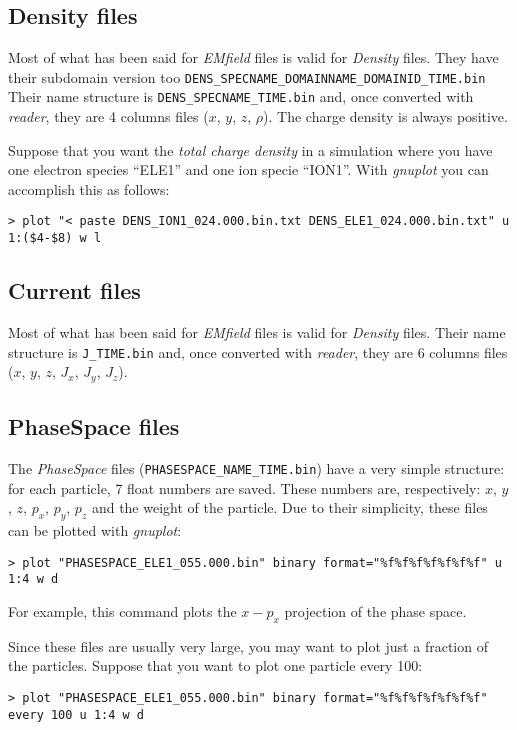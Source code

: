 \documentclass[11pt,a4paper]{report}
\begin{document}
\subsection{Density files}
Most of what has been said for \emph{EMfield} files is valid for \emph{Density} files. They have their subdomain version too \verb+DENS_SPECNAME_DOMAINNAME_DOMAINID_TIME.bin+ Their name structure is \verb+DENS_SPECNAME_TIME.bin+ and, once converted with \emph{reader}, they are 4 columns files ($x$, $y$, $z$, $\rho$). The charge density is always positive.

Suppose that you want the \emph{total charge density} in a simulation where you have one electron species ``ELE1'' and one ion specie ``ION1''. With \emph{gnuplot} you can accomplish this as follows:
\begin{verbatim}
> plot "< paste DENS_ION1_024.000.bin.txt DENS_ELE1_024.000.bin.txt" u 1:($4-$8) w l
\end{verbatim}

\subsection{Current files}
Most of what has been said for \emph{EMfield} files is valid for \emph{Density} files. Their name structure is \verb+J_TIME.bin+ and, once converted with \emph{reader}, they are 6 columns files ($x$, $y$, $z$, $J_x$, $J_y$, $J_z$). 

\subsection{PhaseSpace files}
The \emph{PhaseSpace} files (\verb+PHASESPACE_NAME_TIME.bin+) have a very simple structure: for each particle, 7 float numbers are saved. These numbers are, respectively: $x$, $y$, $z$, $p_x$, $p_y$, $p_z$ and the weight of the particle. Due to their simplicity, these files can be plotted with \emph{gnuplot}: 
\begin{verbatim}
> plot "PHASESPACE_ELE1_055.000.bin" binary format="%f%f%f%f%f%f%f" u 1:4 w d
\end{verbatim}
For example, this command plots the $x-p_x$ projection of the phase space.

Since these files are usually very large, you may want to plot just a fraction of the particles. Suppose that you want to plot one particle every 100:
\begin{verbatim}
> plot "PHASESPACE_ELE1_055.000.bin" binary format="%f%f%f%f%f%f%f" every 100 u 1:4 w d
\end{verbatim} 
\end{document}
